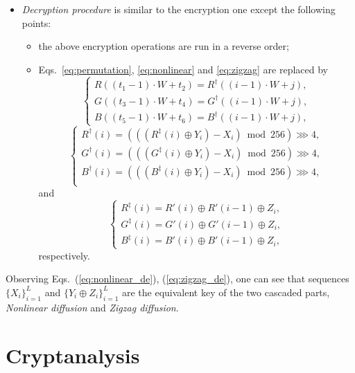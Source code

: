\documentclass{ws-ijbc}
\begin{document}
\begin{itemize}
\item \textit{Decryption procedure} is similar to the encryption one except the following points:
\begin{itemize}
\item the above encryption operations are run in a reverse order;
\item Eqs.~\eqref{eq:permutation}, \eqref{eq:nonlinear} and \eqref{eq:zigzag} are replaced by
\begin{equation}
\nonumber
\begin{cases}
R((t_1-1)\cdot W+ t_2) = R^{\dagger}((i-1)\cdot W+ j), \\
G((t_3-1)\cdot W+ t_4) = G^{\dagger}((i-1)\cdot W+ j), \\
B((t_5-1)\cdot W+ t_6) = B^{\dagger}((i-1)\cdot W+ j),
\end{cases}
\end{equation}
\begin{equation}
\label{eq:nonlinear_de}
\begin{cases}
R^{\dagger}(i) = \left(\left(\left(R^{\ddagger}(i)\oplus Y_{i}\right) - X_{i}\right)\bmod{256}\right)\ggg 4, \\
G^{\dagger}(i) = \left(\left(\left(G^{\ddagger}(i)\oplus Y_{i}\right) - X_{i}\right)\bmod{256}\right)\ggg 4, \\
B^{\dagger}(i) = \left(\left(\left(B^{\ddagger}(i)\oplus Y_{i}\right) - X_{i}\right)\bmod{256}\right)\ggg 4, \\
\end{cases}
\end{equation}
and
\begin{equation}
\label{eq:zigzag_de}
\begin{cases}
R^{\ddagger}(i) = R'(i)\oplus R'(i-1) \oplus Z_{i}, \\
G^{\ddagger}(i) = G'(i)\oplus G'(i-1) \oplus Z_{i}, \\
B^{\ddagger}(i) = B'(i)\oplus B'(i-1) \oplus Z_{i},
\end{cases}
\end{equation}
respectively.
\end{itemize}
\end{itemize}
Observing Eqs.~(\ref{eq:nonlinear_de}), (\ref{eq:zigzag_de}), one can see
that sequences $\{X_{i}\}_{i=1}^{L}$ and $\{Y_{i}\oplus Z_{i}\}_{i=1}^{L}$ are the equivalent key of the two cascaded parts, \textit{Nonlinear diffusion} and
\textit{Zigzag diffusion}.

\section{Cryptanalysis}
\label{sec:ca}
\end{document}
